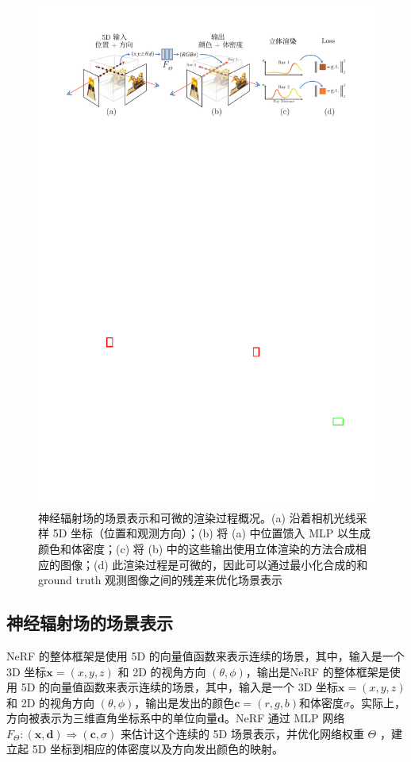\begin{figure}[htbp]
    \centering
    \includegraphics[width=0.95\linewidth]{figures/nerf_io.pdf}
    \caption{神经辐射场的场景表示和可微的渲染过程概况\cite{mildenhall2020nerf}。(a) 沿着相机光线采样 5D 坐标（位置和观测方向）；(b) 将 (a) 中位置馈入 MLP 以生成颜色和体密度；(c) 将 (b) 中的这些输出使用立体渲染的方法合成相应的图像；(d) 此渲染过程是可微的，因此可以通过最小化合成的和 ground truth 观测图像之间的残差来优化场景表示}
    \label{fig:nerf_io}
\end{figure}

\subsection{神经辐射场的场景表示}
NeRF 的整体框架是使用 5D 的向量值函数来表示连续的场景，其中，输入是一个 3D 坐标$\displaystyle \symbf{x} = \left(x, y, z \right)$ 和 2D 的视角方向 $\displaystyle \left(\theta, \phi \right)$，输出是NeRF 的整体框架是使用 5D 的向量值函数来表示连续的场景，其中，输入是一个 3D 坐标$\displaystyle \symbf{x} = \left(x, y, z \right)$ 和 2D 的视角方向 $\displaystyle \left(\theta, \phi \right)$，输出是发出的颜色$\displaystyle \symbf{c} = \left(r, g, b \right)$和体密度$\displaystyle \sigma$。实际上，方向被表示为三维直角坐标系中的单位向量$\displaystyle \symbf{d}$。NeRF 通过 MLP 网络$\displaystyle F_{\Theta} : \left(\symbf{x}, \symbf{d} \right) \Rightarrow \left(\symbf{c}, \sigma \right)$ 来估计这个连续的 5D 场景表示，并优化网络权重 $\displaystyle \Theta$ ，建立起 5D 坐标到相应的体密度以及方向发出颜色的映射。

